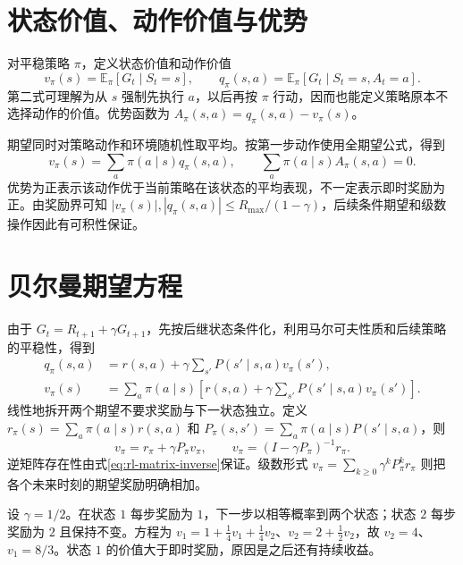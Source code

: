 \documentclass[UTF8,12pt,a4paper,fontset=fandol]{ctexbook}
\begin{document}
\section{状态价值、动作价值与优势}

\begin{definition}[价值与优势]
对平稳策略 $\pi$，定义状态价值和动作价值
\[
v_\pi(s)=\mathbb E_\pi[G_t\mid S_t=s],\qquad
q_\pi(s,a)=\mathbb E_\pi[G_t\mid S_t=s,A_t=a].
\]
第二式可理解为从 $s$ 强制先执行 $a$，以后再按 $\pi$ 行动，因而也能定义策略原本不选择动作的价值。优势函数为 $A_\pi(s,a)=q_\pi(s,a)-v_\pi(s)$。
\end{definition}

期望同时对策略动作和环境随机性取平均。按第一步动作使用全期望公式，得到
\begin{equation}
v_\pi(s)=\sum_a\pi(a\mid s)q_\pi(s,a),\qquad
\sum_a\pi(a\mid s)A_\pi(s,a)=0.
\label{eq:rl-value-advantage}
\end{equation}
优势为正表示该动作优于当前策略在该状态的平均表现，不一定表示即时奖励为正。由奖励界可知 $|v_\pi(s)|,|q_\pi(s,a)|\leq R_{\max}/(1-\gamma)$，后续条件期望和级数操作因此有可积性保证。

\section{贝尔曼期望方程}

由于 $G_t=R_{t+1}+\gamma G_{t+1}$，先按后继状态条件化，利用马尔可夫性质和后续策略的平稳性，得到
\begin{align}
q_\pi(s,a)&=r(s,a)+\gamma\sum_{s'}P(s'\mid s,a)v_\pi(s'),\label{eq:rl-bellman-q}\\
v_\pi(s)&=\sum_a\pi(a\mid s)\left[r(s,a)+\gamma\sum_{s'}P(s'\mid s,a)v_\pi(s')\right].\label{eq:rl-bellman-v}
\end{align}
线性地拆开两个期望不要求奖励与下一状态独立。定义 $r_\pi(s)=\sum_a\pi(a\mid s)r(s,a)$ 和 $P_\pi(s,s')=\sum_a\pi(a\mid s)P(s'\mid s,a)$，则
\[
v_\pi=r_\pi+\gamma P_\pi v_\pi,
\qquad v_\pi=(I-\gamma P_\pi)^{-1}r_\pi.
\]
逆矩阵存在性由式\eqref{eq:rl-matrix-inverse}保证。级数形式 $v_\pi=\sum_{k\geq0}\gamma^kP_\pi^kr_\pi$ 则把各个未来时刻的期望奖励明确相加。

\begin{example}[两个状态的精确价值]
设 $\gamma=1/2$。在状态 $1$ 每步奖励为 $1$，下一步以相等概率到两个状态；状态 $2$ 每步奖励为 $2$ 且保持不变。方程为 $v_1=1+\tfrac14v_1+\tfrac14v_2$、$v_2=2+\tfrac12v_2$，故 $v_2=4$、$v_1=8/3$。状态 $1$ 的价值大于即时奖励，原因是之后还有持续收益。
\end{example}
\end{document}

